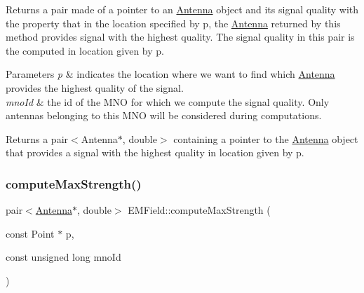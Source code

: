 Returns a pair made of a pointer to an \mbox{\hyperlink{class_antenna}{Antenna}} object and its signal quality with the property that in the location specified by p, the \mbox{\hyperlink{class_antenna}{Antenna}} returned by this method provides signal with the highest quality. The signal quality in this pair is the computed in location given by p. 
\begin{DoxyParams}{Parameters}
{\em p} & indicates the location where we want to find which \mbox{\hyperlink{class_antenna}{Antenna}} provides the highest quality of the signal. \\
\hline
{\em mno\+Id} & the id of the M\+NO for which we compute the signal quality. Only antennas belonging to this M\+NO will be considered during computations. \\
\hline
\end{DoxyParams}
\begin{DoxyReturn}{Returns}
a pair$<$\+Antenna$\ast$, double$>$ containing a pointer to the \mbox{\hyperlink{class_antenna}{Antenna}} object that provides a signal with the highest quality in location given by p. 
\end{DoxyReturn}
\mbox{\label{class_e_m_field_a9a3cdbca4fcf408ce58a30fb98de1bbb}} 
\subsubsection{\texorpdfstring{computeMaxStrength()}{computeMaxStrength()}}
{\footnotesize\ttfamily pair$<$\mbox{\hyperlink{class_antenna}{Antenna}}$\ast$, double$>$ E\+M\+Field\+::compute\+Max\+Strength (\begin{DoxyParamCaption}\item[{const Point $\ast$}]{p,  }\item[{const unsigned long}]{mno\+Id }\end{DoxyParamCaption})}


